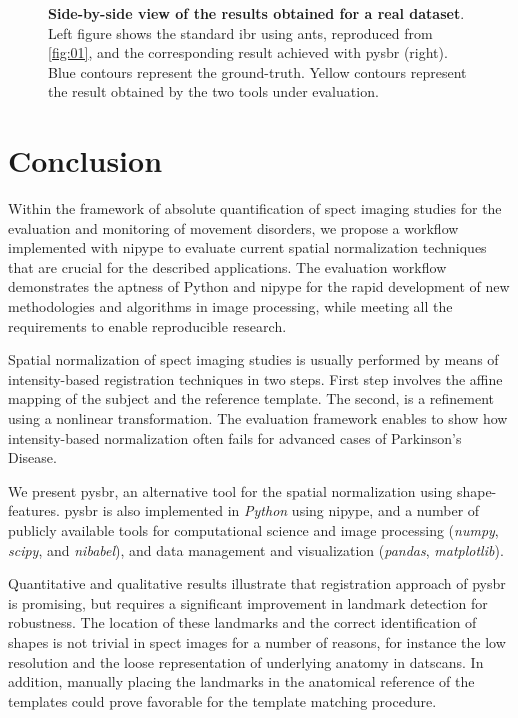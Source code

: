 \documentclass{frontiers}
\newcommand{\insertgraphic}[2]{}
\newcommand{\insertgraphic}[2]{\texttt{[image: \#2]}}
\begin{document}
\begin{figure}
\centering 
\insertgraphic{width=1.0\linewidth}{figures/06-results-mri-pysbr}
\caption{ \label{fig:real_dataset_result} 
  \textbf{Side-by-side view of the results obtained for a real dataset}.
  Left figure shows the standard \gls*{ibr} using \gls*{ants}, reproduced from
  \autoref{fig:01}, and the corresponding result achieved with \gls*{pysbr}
  (right). Blue contours represent the ground-truth. Yellow contours represent
  the result obtained by the two tools under evaluation.
}
\end{figure}


\section{Conclusion}
\label{sec:conclusion}
Within the framework of absolute quantification of \gls*{spect}
  imaging studies for the evaluation and monitoring of movement
  disorders, we propose a workflow implemented with \gls*{nipype}
  to evaluate current spatial normalization techniques that are
  crucial for the described applications.
The evaluation workflow demonstrates the aptness of Python 
  and \gls*{nipype} for the rapid development of new methodologies
  and algorithms in image processing, while meeting
  all the requirements to enable reproducible research.

Spatial normalization of \gls*{spect} imaging studies is
  usually performed by means of intensity-based registration
  techniques in two steps.
First step involves the affine mapping of the subject and the
  reference template.
The second, is a refinement using a nonlinear transformation.
The evaluation framework enables to show 
  how intensity-based normalization often fails
  for advanced cases of Parkinson's Disease.

We present \gls*{pysbr}, an alternative tool for the
  spatial normalization using shape-features.
\Gls*{pysbr} is also implemented in \emph{Python} using
  \gls*{nipype}, and a number of publicly available tools
  for computational science and image processing
  (\emph{numpy}, \emph{scipy}, and \emph{nibabel}),
  and data management and visualization (\emph{pandas},
  \emph{matplotlib}).
  
Quantitative and qualitative results illustrate that registration approach
  of \gls*{pysbr} is promising, but requires a significant improvement
  in landmark detection for robustness.
The location of these landmarks and the correct identification of
  shapes is not trivial in \gls*{spect} images for a number of reasons,
  for instance the low resolution and the loose representation of
  underlying anatomy in \glspl*{datscan}.
In addition, manually placing the landmarks in the anatomical reference of the 
  templates could prove favorable for the template matching procedure.
 
\end{document}
